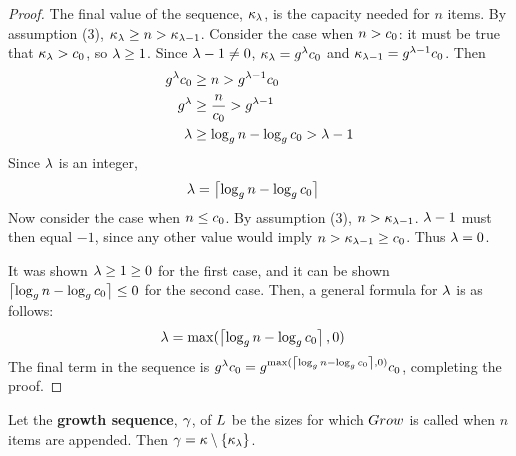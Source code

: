 \begin{proof}
	The final value of the sequence, $\kappa_\lambda$, is the capacity needed for $n$ items. By assumption (3), $\kappa_\lambda \geq n > \kappa_{\lambda - 1}$. Consider the case when $n > c_0$: it must be true that $\kappa_\lambda > c_0$, so $\lambda \geq 1$. Since $\lambda - 1 \neq 0$, $\kappa_\lambda = g^\lambda c_0$ and $\kappa_{\lambda - 1} = g^{\lambda - 1}c_0$. Then
	\begin{align*}
	g^\lambda c_0 &\geq n > g^{\lambda - 1}c_0\\
	g^\lambda &\geq \frac{n}{c_0} > g^{\lambda - 1}\\
	\lambda &\geq \log_{g} n - \log_{g} c_0 > \lambda - 1\\
	\end{align*}
	Since $\lambda$ is an integer,
	\begin{align*}
	\lambda &= \left\lceil \log_{g} n - \log_{g} c_0 \right\rceil
	\end{align*}
	Now consider the case when $n \leq c_0$. By assumption (3), $n > \kappa_{\lambda - 1}$. $\lambda - 1$ must then equal $-1$, since any other value would imply $n > \kappa_{\lambda - 1} \geq c_0$. Thus $\lambda = 0$.
	
	It was shown $\lambda \geq 1 \geq 0$ for the first case, and it can be shown $\left\lceil \log_{g} n - \log_{g} c_0 \right\rceil \leq 0$ for the second case. Then, a general formula for $\lambda$ is as follows:
	\begin{align*}
	\lambda &= \max(\left\lceil \log_{g} n - \log_{g} c_0 \right\rceil, 0)
	\end{align*}
	The final term in the sequence is $g^\lambda c_0 = g^{\max(\left\lceil \log_{g} n - \log_{g} c_0 \right\rceil, 0)}c_0$, completing the proof.
\end{proof}

\begin{corollary}
\label{coro:GrowthSeq}
	Let the \textbf{growth sequence}, $\gamma$, of $L$ be the sizes for which $Grow$ is called when $n$ items are appended. Then $\gamma = \kappa \setminus \left\{ \kappa_\lambda \right\}$.
\end{corollary}

